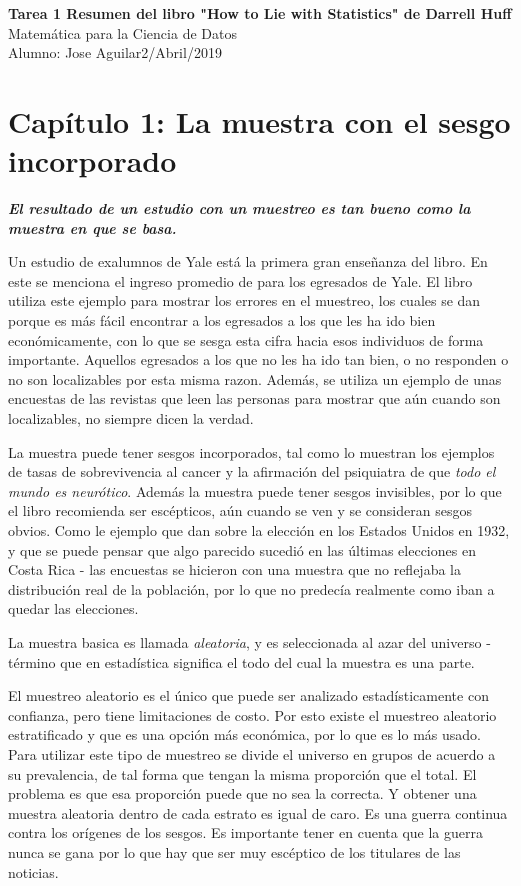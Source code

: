 \documentclass[letterpaper, 11pt]{article}
\begin{document}
\linespread{1.5}
\noindent
\large\textbf{Tarea 1 Resumen del libro "How to Lie with Statistics" de Darrell Huff} \\
\normalsize Matemática para la Ciencia de Datos \\
Alumno: Jose Aguilar\hfill 2/Abril/2019 \\


\section*{Capítulo 1: La muestra con el sesgo incorporado}

\textbf{\textit{El resultado de un estudio con un muestreo es tan bueno como la muestra en que se basa.}}

Un estudio de exalumnos de Yale está la primera gran enseñanza del libro. En este se menciona el ingreso promedio de  para los egresados de Yale. El libro utiliza este ejemplo para mostrar los errores en el muestreo, los cuales se dan porque es más fácil encontrar a los egresados a los que les ha ido bien económicamente, con lo que se sesga esta cifra hacia esos individuos de forma importante. Aquellos egresados a los que no les ha ido tan bien, o no responden o no son localizables por esta misma razon. Además, se utiliza un ejemplo de unas encuestas de las revistas que leen las personas para mostrar que aún cuando son localizables, no siempre dicen la verdad.

La muestra puede tener sesgos incorporados, tal como lo muestran los ejemplos de tasas de sobrevivencia al cancer y la afirmación del psiquiatra de que \textit{todo el mundo es neurótico}. Además la muestra puede tener sesgos invisibles, por lo que el libro recomienda ser escépticos, aún cuando se ven y se consideran sesgos obvios. Como le ejemplo que dan sobre la elección en los Estados Unidos en 1932, y que se puede pensar que algo parecido sucedió en las últimas elecciones en Costa Rica - las encuestas se hicieron con una muestra que no reflejaba la distribución real de la población, por lo que no predecía realmente como iban a quedar las elecciones.

La muestra basica es llamada \textit{aleatoria}, y es seleccionada al azar del universo - término que en estadística significa el todo del cual la muestra es una parte.

El muestreo aleatorio es el único que puede ser analizado estadísticamente con confianza, pero tiene limitaciones de costo. Por esto existe el muestreo aleatorio estratificado y que es una opción más económica, por lo que es lo más usado.  Para utilizar este tipo de muestreo se divide el universo en grupos de acuerdo a su prevalencia, de tal forma que tengan la misma proporción que el total. El problema es que esa proporción puede que no sea la correcta. Y obtener una muestra aleatoria dentro de cada estrato es igual de caro. Es una guerra continua contra los orígenes de los sesgos. Es importante tener en cuenta que la guerra nunca se gana por lo que hay que ser muy escéptico de los titulares de las noticias.
 
\end{document}
